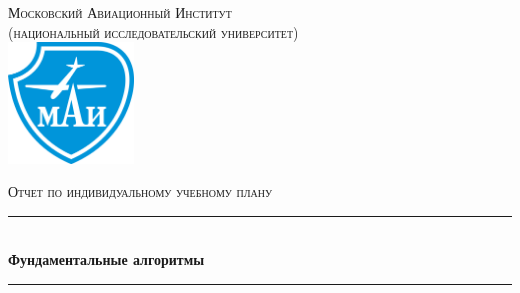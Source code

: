\documentclass[a4paper,12pt]{article}
\begin{document}
\begin{titlepage}

\newcommand{\HRule}{\rule{\linewidth}{0.5mm}} %

\center %




\textsc{\large Московский Авиационный Институт\\(национальный исследовательский университет)}\\[1.5cm] %




\includegraphics[width=0.25\textwidth]{mai.png}\\[1cm]


\vspace{40px}

\textsc{\Large Отчет по индивидуальному учебному плану}\\[0.5cm] %




\HRule \\[0.4cm]
{ \huge \bfseries Фундаментальные алгоритмы}\\[0.4cm] %
\HRule \\[1.5cm]




\end{titlepage}
\end{document}
